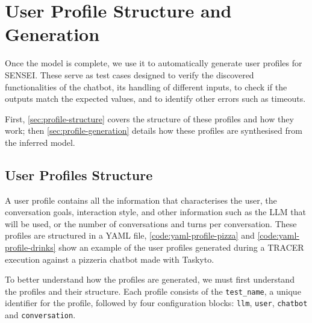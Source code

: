 
\chapter{User Profile Structure and Generation}\label{chapter:user-profiles}

Once the model is complete,
we use it to automatically generate user profiles for SENSEI.
These serve as test cases designed to verify
the discovered functionalities of the chatbot,
its handling of different inputs,
to check if the outputs match the expected values,
and to identify other errors such as timeouts.

First, \autoref{sec:profile-structure}
covers the structure of these profiles and how they work;
then \autoref{sec:profile-generation}
details how these profiles are synthesised from the inferred model.


\section{User Profiles Structure}\label{sec:profile-structure}

A user profile contains all the information
that characterises the user,
the conversation goals,
interaction style,
and other information such as the \ac{LLM} that will be used,
or the number of conversations and turns per conversation.
These profiles are structured in a YAML file,
\autoref{code:yaml-profile-pizza} and \autoref{code:yaml-profile-drinks}
show an example of the user profiles generated during a \ac{TRACER} execution
against a pizzeria chatbot made with Taskyto.







To better understand how the profiles are generated,
we must first understand the profiles and their structure.
Each profile consists of the \texttt{test\_name},
a unique identifier for the profile,
followed by four configuration blocks:
\texttt{llm}, \texttt{user}, \texttt{chatbot} and \texttt{conversation}.

